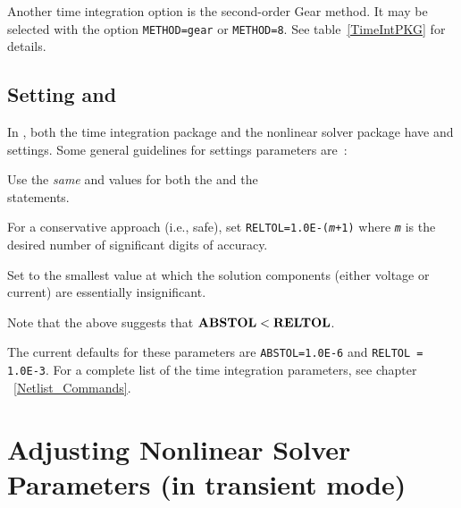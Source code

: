Another time integration option is the second-order Gear method.  It
may be selected with the  option \texttt{METHOD=gear} or
\texttt{METHOD=8}. See table~\ref{TimeIntPKG} for details.

\subsection{Setting  and }
In \Xyce{}, both the time integration package and the nonlinear solver package
have  and  settings.  Some general guidelines for
settings parameters are~\cite{Petzold:1996}:
\begin{XyceItemize}
\item Use the \emph{same}  and  values for both
  the  and the \\  
  statements.
\item For a conservative approach (i.e., safe), set \texttt{RELTOL=1.0E-(\emph{m}+1)}
  where \texttt{\emph{m}} is the desired number of significant digits of
  accuracy.
\item Set  to the smallest value at which the solution
  components (either voltage or current) are essentially insignificant.
\item Note that the above suggests that $\textrm{\textbf{ABSTOL}}<\textrm{\textbf{RELTOL}}$.
\end{XyceItemize}

The current defaults for these parameters are \texttt{ABSTOL=1.0E-6} and
\texttt{RELTOL = 1.0E-3}.  For a complete list of the time integration
parameters, see chapter ~\ref{Netlist_Commands}.

\section{Adjusting Nonlinear Solver Parameters (in transient mode)}

